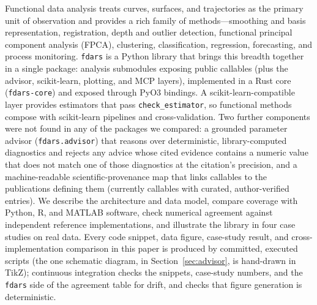 Functional data analysis treats curves, surfaces, and trajectories as the
primary unit of observation and provides a rich family of methods---smoothing
and basis representation, registration, depth and outlier detection, functional
principal component analysis (FPCA), clustering, classification, regression,
forecasting, and process monitoring.
\texttt{fdars} is a Python library that brings this breadth together in a
single package: \nsubmodules{} analysis submodules exposing
\npubliccallables{} public callables (plus the advisor, scikit-learn, plotting,
and MCP layers), implemented in a Rust core (\texttt{fdars-core}) and exposed through
PyO3 bindings.
A scikit-learn-compatible layer provides \nsklearnestimators{} estimators that
pass \texttt{check\_estimator}, so functional methods compose with scikit-learn
pipelines and cross-validation.
Two further components were not found in any of the packages we compared: a
grounded parameter advisor (\texttt{fdars.advisor}) that reasons over
deterministic, library-computed diagnostics and rejects any advice whose
cited evidence contains a numeric value that does not match one of those
diagnostics at the citation's precision, and a machine-readable
scientific-provenance map that links callables to the publications
defining them (currently \ncoverage{} callables with curated, author-verified
entries).
We describe the architecture and data model, compare coverage with Python, R,
and MATLAB software, check numerical agreement against independent reference
implementations, and illustrate the library in four case studies on real data.
Every code snippet, data figure, case-study result, and cross-implementation
comparison in this paper is produced by committed, executed scripts (the one
schematic diagram, in Section~\ref{sec:advisor}, is hand-drawn in TikZ);
continuous integration checks the snippets, case-study numbers, and the
\texttt{fdars} side of the agreement table for drift, and checks that figure
generation is deterministic.
